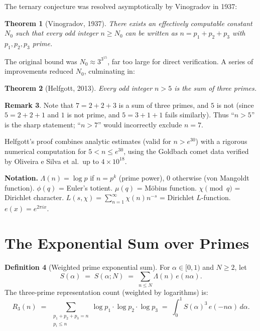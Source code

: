 \documentclass[12pt,a4paper]{amsart}
\newtheorem{theorem}{Theorem}[section]
\theoremstyle{definition}
\newtheorem{definition}[theorem]{Definition}
\newtheorem{remark}[theorem]{Remark}
\newcommand{\eq}[1]{e\!\left(#1\right)}
\begin{document}
The ternary conjecture was resolved asymptotically by Vinogradov in 1937:

\begin{theorem}[Vinogradov, 1937]\label{thm:vinogradov}
  There exists an effectively computable constant $N_0$ such that every
  odd integer $n \geq N_0$ can be written as $n = p_1 + p_2 + p_3$ with
  $p_1, p_2, p_3$ prime.
\end{theorem}

The original bound was $N_0 \approx 3^{3^{15}}$, far too large for direct
verification.  A series of improvements reduced $N_0$, culminating in:

\begin{theorem}[Helfgott, 2013]\label{thm:helfgott}
  Every odd integer $n > 5$ is the sum of three primes.
\end{theorem}

\begin{remark}
  Note that $7 = 2+2+3$ is a sum of three primes, and $5$ is not
  (since $5 = 2+2+1$ and $1$ is not prime, and $5 = 3+1+1$ fails similarly).
  Thus ``$n > 5$'' is the sharp statement; ``$n > 7$'' would incorrectly exclude $n=7$.
\end{remark}

Helfgott's proof combines analytic estimates (valid for $n > e^{30}$)
with a rigorous numerical computation for $5 < n \leq e^{30}$, using the
Goldbach comet data verified by Oliveira e Silva et al.\ up to $4 \times 10^{18}$.

\textbf{Notation.}
$\Lambda(n) = \log p$ if $n = p^k$ (prime power), $0$ otherwise
(von Mangoldt function).  $\phi(q)$ = Euler's totient.
$\mu(q)$ = M\"obius function.  $\chi \pmod q$ = Dirichlet character.
$L(s,\chi) = \sum_{n=1}^\infty \chi(n) n^{-s}$ = Dirichlet $L$-function.
$\eq{x} = e^{2\pi ix}$.

\section{The Exponential Sum over Primes}
\label{sec:expsum}

\begin{definition}[Weighted prime exponential sum]
  For $\alpha \in [0,1)$ and $N \geq 2$, let
  \[
    S(\alpha) \;=\; S(\alpha; N)
    \;=\; \sum_{n \leq N} \Lambda(n)\, \eq{n\alpha}.
  \]
  The three-prime representation count (weighted by logarithms) is:
  \[
    R_3(n) \;=\; \sum_{\substack{p_1 + p_2 + p_3 = n\\ p_i \leq n}}
                 \log p_1 \cdot \log p_2 \cdot \log p_3
    \;=\; \int_0^1 S(\alpha)^3\, \eq{-n\alpha}\, d\alpha.
  \]
\end{definition}
\end{document}
